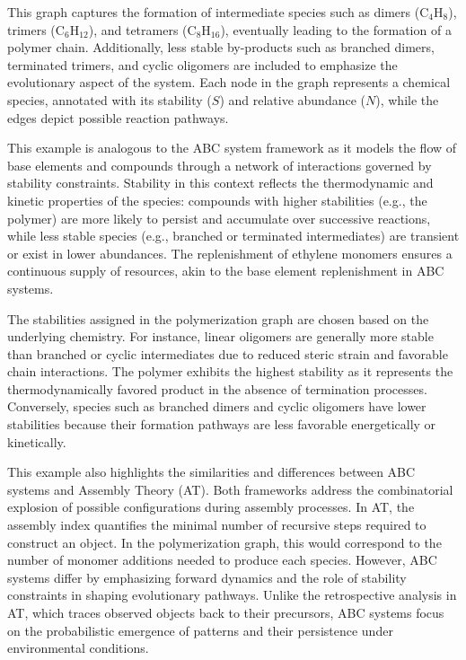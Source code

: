 \documentclass[entropy,article,submit,pdftex,oneauthor]{Definitions/mdpi}
\begin{document}
This graph captures the formation of intermediate species such as dimers (\( \text{C}_4\text{H}_8 \)), trimers (\( \text{C}_6\text{H}_{12} \)), and tetramers (\( \text{C}_8\text{H}_{16} \)), eventually leading to the formation of a polymer chain. Additionally, less stable by-products such as branched dimers, terminated trimers, and cyclic oligomers are included to emphasize the evolutionary aspect of the system. Each node in the graph represents a chemical species, annotated with its stability (\( S \)) and relative abundance (\( N \)), while the edges depict possible reaction pathways.

This example is analogous to the ABC system framework as it models the flow of base elements and compounds through a network of interactions governed by stability constraints. Stability in this context reflects the thermodynamic and kinetic properties of the species: compounds with higher stabilities (e.g., the polymer) are more likely to persist and accumulate over successive reactions, while less stable species (e.g., branched or terminated intermediates) are transient or exist in lower abundances. The replenishment of ethylene monomers ensures a continuous supply of resources, akin to the base element replenishment in ABC systems.

The stabilities assigned in the polymerization graph are chosen based on the underlying chemistry. For instance, linear oligomers are generally more stable than branched or cyclic intermediates due to reduced steric strain and favorable chain interactions. The polymer exhibits the highest stability as it represents the thermodynamically favored product in the absence of termination processes. Conversely, species such as branched dimers and cyclic oligomers have lower stabilities because their formation pathways are less favorable energetically or kinetically.

This example also highlights the similarities and differences between ABC systems and Assembly Theory (AT). Both frameworks address the combinatorial explosion of possible configurations during assembly processes. In AT, the assembly index quantifies the minimal number of recursive steps required to construct an object. In the polymerization graph, this would correspond to the number of monomer additions needed to produce each species. However, ABC systems differ by emphasizing forward dynamics and the role of stability constraints in shaping evolutionary pathways. Unlike the retrospective analysis in AT, which traces observed objects back to their precursors, ABC systems focus on the probabilistic emergence of patterns and their persistence under environmental conditions. 
\end{document}
